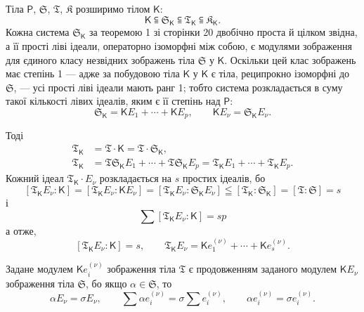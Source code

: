 \documentclass[11pt]{article}
\begin{document}
Тіла \(\mathsf P\), \(\mathfrak S\), \(\mathfrak T\), \(\mathfrak K\) розширимо тілом \(\mathsf{K}\):
\[
\mathsf{K}\subseteqq \mathfrak S_{\mathsf{K}}\subseteqq \mathfrak T_{\mathsf{K}}\subseteqq \mathfrak K_{\mathsf{K}}.
\]
Кожна система \(\mathfrak S_{\mathsf{K}}\) за теоремою 1 зі сторінки 20 двобічно проста й цілком звідна, а її прості ліві ідеали, операторно ізоморфні між собою, є модулями зображення для єдиного класу незвідних зображень тіла \(\mathfrak S\) у \(\mathsf{K}\). Оскільки цей клас зображень має степінь 1 --- адже за побудовою тіла \(\mathsf{K}\) у \(\mathsf{K}\) є тіла, реципрокно ізоморфні до \(\mathfrak S\), --- усі прості ліві ідеали мають ранг 1; тобто система розкладається в суму такої кількості лівих ідеалів, яким є її степінь над \(\mathsf P\):
\[
\mathfrak S_{\mathsf{K}}=\mathsf K E_1+\cdots+\mathsf K E_p,\qquad \mathsf K E_\nu=\mathfrak S_{\mathsf{K}} E_\nu.
\]

Тоді
\[
\begin{aligned}
\mathfrak T_{\mathsf{K}}&=\mathfrak T\cdot \mathsf{K}=\mathfrak T\cdot \mathfrak S_{\mathsf{K}},\\
\mathfrak T_{\mathsf{K}}&=\mathfrak T\mathfrak S_{\mathsf{K}} E_1+\cdots+\mathfrak T\mathfrak S_{\mathsf{K}} E_p
              =\mathfrak T_{\mathsf{K}} E_1+\cdots+\mathfrak T_{\mathsf{K}} E_p.
\end{aligned}
\]
Кожний ідеал \(\mathfrak T_{\mathsf{K}}\cdot E_\nu\) розкладається на \(s\) простих ідеалів, бо
\[
[\mathfrak T_{\mathsf{K}} E_\nu:\mathsf{K}]=[\mathfrak T_{\mathsf{K}} E_\nu:\mathsf K E_\nu]=[\mathfrak T_{\mathsf{K}} E_\nu:\mathfrak S_{\mathsf{K}} E_\nu]\leqq[\mathfrak T_{\mathsf{K}}:\mathfrak S_{\mathsf{K}}]=[\mathfrak T:\mathfrak S]=s
\]
і
\[
\sum [\mathfrak T_{\mathsf{K}} E_\nu:\mathsf{K}]=sp
\]
а отже,
\[
[\mathfrak T_{\mathsf{K}} E_\nu:\mathsf{K}]=s,
\qquad
\mathfrak T_{\mathsf{K}} E_\nu=\mathsf K e_1^{(\nu)}+\cdots+\mathsf K e_s^{(\nu)}.
\]

Задане модулем \(\mathsf K e_i^{(\nu)}\) зображення тіла \(\mathfrak T\) є продовженням заданого модулем \(\mathsf K E_\nu\) зображення тіла \(\mathfrak S\), бо якщо \(\alpha\in \mathfrak S\), то
\[
\alpha E_\nu=\sigma E_\nu,\qquad
\sum \alpha e_i^{(\nu)}=\sigma\sum e_i^{(\nu)},\qquad
\alpha e_i^{(\nu)}=\sigma e_i^{(\nu)}.
\]
\end{document}
